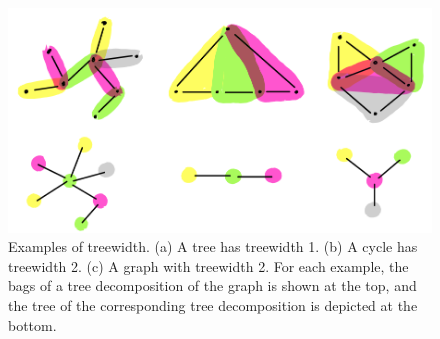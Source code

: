 \begin{figure}
    \includegraphics[width=\textwidth]{figures/treewidth-example.png}
    \caption{Examples of treewidth. (a) A tree has treewidth 1. (b) A cycle has treewidth 2. (c) A graph with treewidth 2. For each example, the bags of a tree decomposition of the graph is shown at the top, and the tree of the corresponding tree decomposition is depicted at the bottom.}
    \label{fig:treewidth-example}
\end{figure}